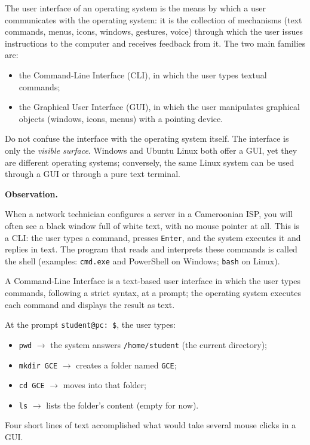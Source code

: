 \documentclass[11pt]{article}
\newcommand{\cle}[1]{{\popxbold\color{popdark}#1}}
\newcounter{popsec}
\newcounter{popsub}
\newcommand{\courssub}[1]{%
  \stepcounter{popsub}%
  \par\vspace{9pt}\noindent{\popxbold\fontsize{11.5}{13}\selectfont\color{popink}{\color{poporange}\thepopsec.\thepopsub}\hspace{6pt}#1}\par\nopagebreak\vspace{4pt}
}
\begin{document}
\begin{definition}
The \cle{user interface} of an operating system is the means by which a user communicates with the operating system: it is the collection of mechanisms (text commands, menus, icons, windows, gestures, voice) through which the user issues instructions to the computer and receives feedback from it. The two main families are:
\begin{itemize}
\item the \cle{Command-Line Interface} (CLI), in which the user types textual commands;
\item the \cle{Graphical User Interface} (GUI), in which the user manipulates graphical objects (windows, icons, menus) with a pointing device.
\end{itemize}
\end{definition}

\begin{attention}
Do not confuse the interface with the operating system itself. The interface is only the \emph{visible surface}. Windows and Ubuntu Linux both offer a GUI, yet they are different operating systems; conversely, the same Linux system can be used through a GUI or through a pure text terminal.
\end{attention}

\courssub{The Command-Line Interface (CLI)}

\textbf{Observation.}\par
When a network technician configures a server in a Cameroonian ISP, you will often see a black window full of white text, with no mouse pointer at all. This is a CLI: the user types a command, presses \texttt{Enter}, and the system executes it and replies in text. The program that reads and interprets these commands is called the \cle{shell} (examples: \texttt{cmd.exe} and PowerShell on Windows; \texttt{bash} on Linux).

\begin{definition}
A \cle{Command-Line Interface} is a text-based user interface in which the user types commands, following a strict syntax, at a \cle{prompt}; the operating system executes each command and displays the result as text.
\end{definition}

\begin{exemplebox}
At the prompt \texttt{student@pc:~\$}, the user types:
\begin{itemize}
\item \texttt{pwd} \quad $\rightarrow$ the system answers \texttt{/home/student} (the current directory);
\item \texttt{mkdir GCE} \quad $\rightarrow$ creates a folder named \texttt{GCE};
\item \texttt{cd GCE} \quad $\rightarrow$ moves into that folder;
\item \texttt{ls} \quad $\rightarrow$ lists the folder's content (empty for now).
\end{itemize}
Four short lines of text accomplished what would take several mouse clicks in a GUI.
\end{exemplebox}
\end{document}
